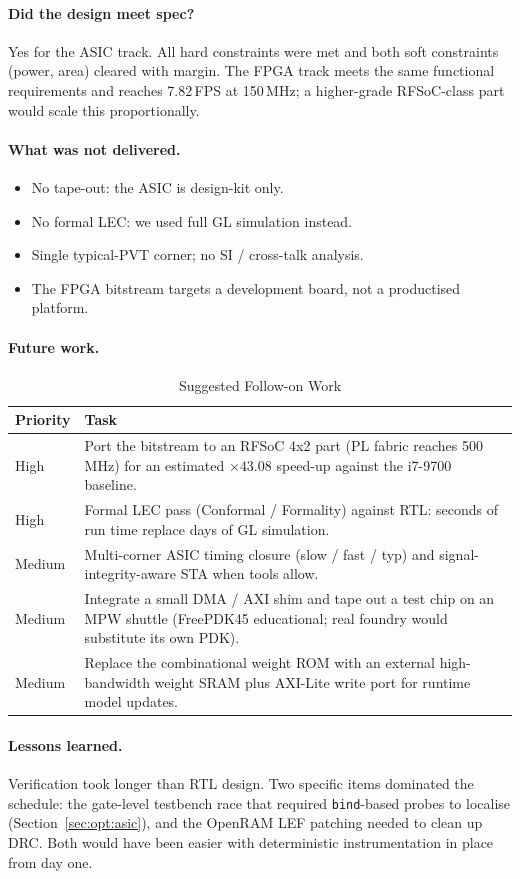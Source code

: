 \paragraph{Did the design meet spec?} Yes for the ASIC track. All hard constraints were met and both soft constraints (power, area) cleared with margin. The FPGA track meets the same functional requirements and reaches 7.82\,FPS at 150\,MHz; a higher-grade RFSoC-class part would scale this proportionally.

\paragraph{What was not delivered.}
\begin{itemize}[nosep]
\item No tape-out: the ASIC is design-kit only.
\item No formal LEC: we used full GL simulation instead.
\item Single typical-PVT corner; no SI / cross-talk analysis.
\item The FPGA bitstream targets a development board, not a productised platform.
\end{itemize}

\paragraph{Future work.}

\begin{table}[H]
\centering
\caption{Suggested Follow-on Work}
\label{tab:future}
\begin{tabularx}{\textwidth}{l X}
\toprule
\textbf{Priority} & \textbf{Task} \\
\midrule
High   & Port the bitstream to an RFSoC 4x2 part (PL fabric reaches 500\,MHz) for an estimated $\times43.08$ speed-up against the i7-9700 baseline. \\
High   & Formal LEC pass (Conformal / Formality) against RTL: seconds of run time replace days of GL simulation. \\
Medium & Multi-corner ASIC timing closure (slow / fast / typ) and signal-integrity-aware STA when tools allow. \\
Medium & Integrate a small DMA / AXI shim and tape out a test chip on an MPW shuttle (FreePDK45 educational; real foundry would substitute its own PDK). \\
Medium & Replace the combinational weight ROM with an external high-bandwidth weight SRAM plus AXI-Lite write port for runtime model updates. \\
\bottomrule
\end{tabularx}
\end{table}

\paragraph{Lessons learned.} Verification took longer than RTL design. Two specific items dominated the schedule: the gate-level testbench race that required \texttt{bind}-based probes to localise (Section~\ref{sec:opt:asic}), and the OpenRAM LEF patching needed to clean up DRC. Both would have been easier with deterministic instrumentation in place from day one.
